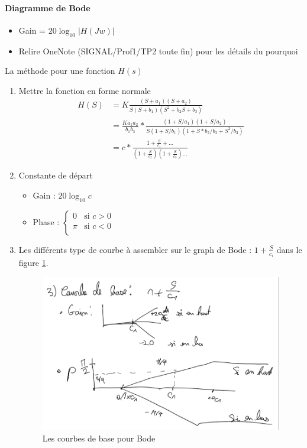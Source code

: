 \documentclass{article}
\theoremstyle{plain}%
\theoremstyle{definition}
\theoremstyle{remark}
\begin{document}
\paragraph*{Diagramme de Bode}
\begin{itemize}
    \item Gain = $ 20 \log_{10} \left| H(Jw) \right| $
    \item Relire OneNote (SIGNAL/Prof1/TP2 toute fin) pour les détails du pourquoi 
\end{itemize}
La méthode pour une fonction $ H(s) $ 
\begin{enumerate}
    \item Mettre la fonction en forme normale 
    \begin{align*}
        H(S) &= K \frac{(S + a_1)(S+a_2)}{S(S+b_1)(S^2 + b_2 S + b_3)} \\
            &= \frac{K a_1 a_2}{b_1 b_3} * \frac{(1 + S/a_1)(1+S/a_2)}{S(1+S/b_1)(1 + S*b_2/b_2 + S^2/b_3)} \\ 
            &= c * \frac{1 + \frac{S}{c_1} + \dots}{(1 + \frac{S}{c_2})(1 + \frac{S}{c_3})\dots}
    \end{align*}
    \item Constante de départ \begin{itemize}
        \item Gain : $ 20 \log_{10} c $ 
        \item Phase : $ \begin{cases}
        0 &\text{si } c>0 \\
        \pi  &\text{si }c < 0 \\
        \end{cases}  $ 
    \end{itemize} 
    \item Les différents type de courbe à assembler sur le graph de Bode : $ 1 + \frac{S}{c_i} $ dans le figure \ref{bode}.
    \begin{figure}[!htbp]
        \centering
        \includegraphics*[width=.5\textwidth]{./bode.png}
        \caption{Les courbes de base pour Bode}
        \label{bode}
    \end{figure}
\end{enumerate}
\end{document}
